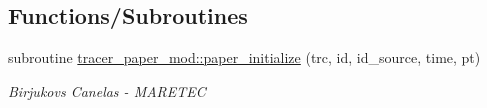 \subsection*{Functions/\+Subroutines}
\begin{DoxyCompactItemize}
\item 
subroutine \hyperlink{namespacetracer__paper__mod_a4e3b16f967d34cd206499188e17ac4f2}{tracer\+\_\+paper\+\_\+mod\+::paper\+\_\+initialize} (trc, id, id\+\_\+source, time, pt)
\begin{DoxyCompactList}\small\item\em Birjukovs Canelas -\/ M\+A\+R\+E\+T\+EC \end{DoxyCompactList}\end{DoxyCompactItemize}
